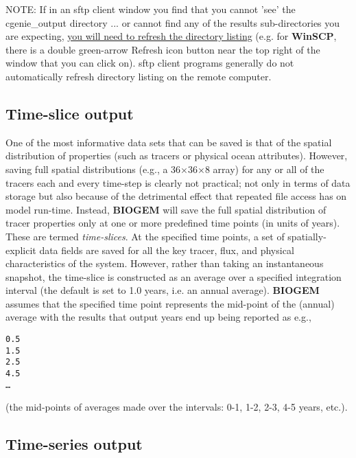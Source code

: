 \noindent NOTE: If in an sftp client window you find that you cannot 'see' the \textsf{\footnotesize cgenie\_output} directory ... or cannot find any of the results sub-directories you are expecting, \uline{you will need to refresh the directory listing} (e.g. for \textbf{WinSCP}, there is a double green-arrow \textsf{\footnotesize Refresh} icon button near the top right of the window that you can click on). sftp client programs generally do not automatically refresh directory listing on the remote computer.


\subsection{Time-slice output}

One of the most informative data sets that can be saved is that of the spatial distribution of properties (such as tracers or physical ocean attributes). However, saving full spatial distributions (e.g., a 36\(\times\)36\(\times\)8 array) for any or all of the tracers each and every time-step is clearly not practical; not only in terms of data storage but also because of the detrimental effect that repeated file access has on model run-time.
Instead, \textbf{BIOGEM} will save the full spatial distribution of tracer properties only at one or more predefined time points (in units of years). These are termed \textit{time-slices}. At the specified time points, a set of spatially-explicit data fields are saved for all the key tracer, flux, and physical characteristics of the system. However, rather than taking an instantaneous snapshot, the time-slice is constructed as an average over a specified integration interval (the default is set to 1.0 years, i.e. an annual average). \textbf{BIOGEM}  assumes that the specified time point represents the mid-point of the (annual) average with the results that output years end up being reported as e.g.,

\newpage

\small\begin{verbatim}
0.5
1.5
2.5
4.5
…
\end{verbatim}\normalsize
(the mid-points of averages made over the intervals: 0-1, 1-2, 2-3, 4-5 years, etc.).


\subsection{Time-series output}

